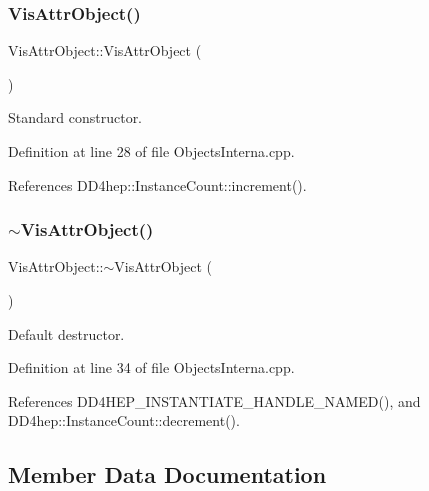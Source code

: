 \subsubsection{\texorpdfstring{Vis\+Attr\+Object()}{VisAttrObject()}}
{\footnotesize\ttfamily Vis\+Attr\+Object\+::\+Vis\+Attr\+Object (\begin{DoxyParamCaption}{ }\end{DoxyParamCaption})}



Standard constructor. 



Definition at line 28 of file Objects\+Interna.\+cpp.



References D\+D4hep\+::\+Instance\+Count\+::increment().

\hypertarget{class_d_d4hep_1_1_geometry_1_1_vis_attr_object_afd52e626a97e4ddcfb911f16fcef517b}{}\label{class_d_d4hep_1_1_geometry_1_1_vis_attr_object_afd52e626a97e4ddcfb911f16fcef517b} 
\subsubsection{\texorpdfstring{$\sim$\+Vis\+Attr\+Object()}{~VisAttrObject()}}
{\footnotesize\ttfamily Vis\+Attr\+Object\+::$\sim$\+Vis\+Attr\+Object (\begin{DoxyParamCaption}{ }\end{DoxyParamCaption})\hspace{0.3cm}{\ttfamily [virtual]}}



Default destructor. 



Definition at line 34 of file Objects\+Interna.\+cpp.



References D\+D4\+H\+E\+P\+\_\+\+I\+N\+S\+T\+A\+N\+T\+I\+A\+T\+E\+\_\+\+H\+A\+N\+D\+L\+E\+\_\+\+N\+A\+M\+E\+D(), and D\+D4hep\+::\+Instance\+Count\+::decrement().



\subsection{Member Data Documentation}
\hypertarget{class_d_d4hep_1_1_geometry_1_1_vis_attr_object_a9a5d2ab42c03b32cb5f69294881ac756}{}\label{class_d_d4hep_1_1_geometry_1_1_vis_attr_object_a9a5d2ab42c03b32cb5f69294881ac756} 
